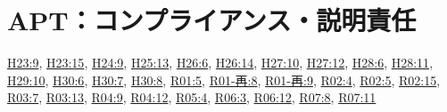 \section{APT：コンプライアンス・説明責任}
\hyperref[q:h23-reg-apt-09]{H23:9}, \hyperref[q:h23-reg-apt-15]{H23:15}, \hyperref[q:h24-reg-apt-09]{H24:9}, \hyperref[q:h25-reg-apt-13]{H25:13}, \hyperref[q:h26-reg-apt-06]{H26:6}, \hyperref[q:h26-reg-apt-14]{H26:14}, \hyperref[q:h27-reg-apt-10]{H27:10}, \hyperref[q:h27-reg-apt-12]{H27:12}, \hyperref[q:h28-reg-apt-06]{H28:6}, \hyperref[q:h28-reg-apt-11]{H28:11}, \hyperref[q:h29-reg-apt-10]{H29:10}, \hyperref[q:h30-reg-apt-06]{H30:6}, \hyperref[q:h30-reg-apt-07]{H30:7}, \hyperref[q:h30-reg-apt-08]{H30:8}, \hyperref[q:r01-reg-apt-05]{R01:5}, \hyperref[q:r01-ret-apt-08]{R01-再:8}, \hyperref[q:r01-ret-apt-09]{R01-再:9}, \hyperref[q:r02-reg-apt-04]{R02:4}, \hyperref[q:r02-reg-apt-05]{R02:5}, \hyperref[q:r02-reg-apt-15]{R02:15}, \hyperref[q:r03-reg-apt-07]{R03:7}, \hyperref[q:r03-reg-apt-13]{R03:13}, \hyperref[q:r04-reg-apt-09]{R04:9}, \hyperref[q:r04-reg-apt-12]{R04:12}, \hyperref[q:r05-reg-apt-04]{R05:4}, \hyperref[q:r06-reg-apt-03]{R06:3}, \hyperref[q:r06-reg-apt-12]{R06:12}, \hyperref[q:r07-reg-apt-08]{R07:8}, \hyperref[q:r07-reg-apt-11]{R07:11}
